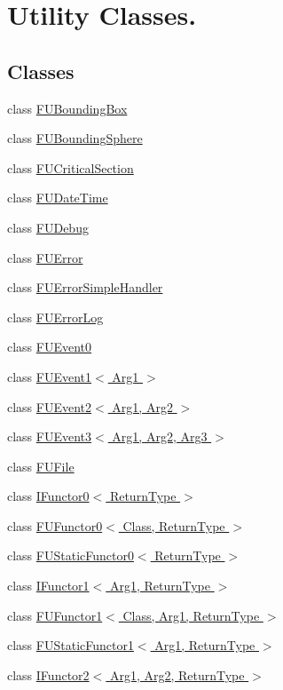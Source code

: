 \hypertarget{group__FUtils}{
\section{Utility Classes.}
\label{group__FUtils}
}
\subsection*{Classes}
\begin{DoxyCompactItemize}
\item 
class \hyperlink{classFUBoundingBox}{FUBoundingBox}
\item 
class \hyperlink{classFUBoundingSphere}{FUBoundingSphere}
\item 
class \hyperlink{classFUCriticalSection}{FUCriticalSection}
\item 
class \hyperlink{classFUDateTime}{FUDateTime}
\item 
class \hyperlink{classFUDebug}{FUDebug}
\item 
class \hyperlink{classFUError}{FUError}
\item 
class \hyperlink{classFUErrorSimpleHandler}{FUErrorSimpleHandler}
\item 
class \hyperlink{classFUErrorLog}{FUErrorLog}
\item 
class \hyperlink{classFUEvent0}{FUEvent0}
\item 
class \hyperlink{classFUEvent1}{FUEvent1$<$ Arg1 $>$}
\item 
class \hyperlink{classFUEvent2}{FUEvent2$<$ Arg1, Arg2 $>$}
\item 
class \hyperlink{classFUEvent3}{FUEvent3$<$ Arg1, Arg2, Arg3 $>$}
\item 
class \hyperlink{classFUFile}{FUFile}
\item 
class \hyperlink{classIFunctor0}{IFunctor0$<$ ReturnType $>$}
\item 
class \hyperlink{classFUFunctor0}{FUFunctor0$<$ Class, ReturnType $>$}
\item 
class \hyperlink{classFUStaticFunctor0}{FUStaticFunctor0$<$ ReturnType $>$}
\item 
class \hyperlink{classIFunctor1}{IFunctor1$<$ Arg1, ReturnType $>$}
\item 
class \hyperlink{classFUFunctor1}{FUFunctor1$<$ Class, Arg1, ReturnType $>$}
\item 
class \hyperlink{classFUStaticFunctor1}{FUStaticFunctor1$<$ Arg1, ReturnType $>$}
\item 
class \hyperlink{classIFunctor2}{IFunctor2$<$ Arg1, Arg2, ReturnType $>$}

\end{DoxyCompactItemize}

